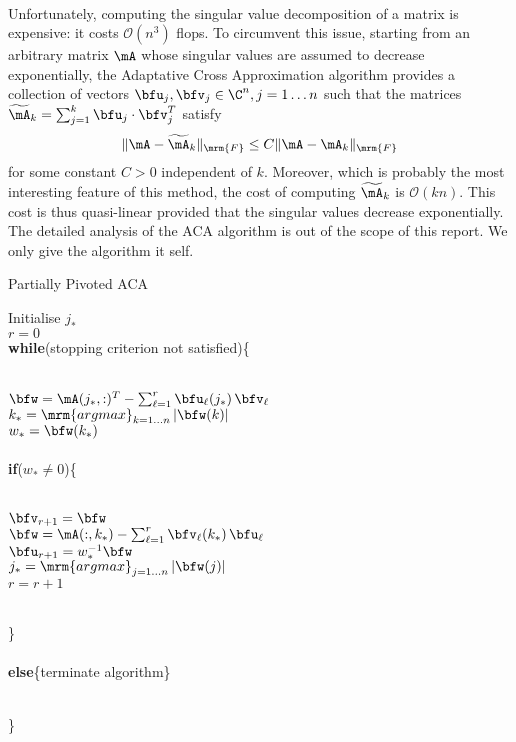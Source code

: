 \quad\\
Unfortunately, computing the singular value 
decomposition  of a matrix is expensive: it costs $\mathcal{O}(n^{3})$ flops. To circumvent this issue, starting from 
an arbitrary matrix $\mA$ whose singular values are assumed to decrease exponentially, the Adaptative 
Cross Approximation algorithm provides a collection of vectors $\bfu_{j},\bfv_{j}\in \C^{n}, j=1\dots n$ such that 
the matrices $\widetilde{\mA}_{k} = \sum_{j=1}^{k}\bfu_{j}\cdot\bfv_{j}^{T}$ satisfy 
$$
\Vert \mA - \widetilde{\mA}_{k}\Vert_{\mrm{F}}\leq C \Vert \mA - \mA_{k}\Vert_{\mrm{F}}
$$
for some constant $C>0$ independent of $k$. Moreover, which is probably the most interesting feature of this method, 
the cost of computing $\widetilde{\mA}_{k}$ is $\mathcal{O}(kn)$. This cost is thus quasi-linear provided that the singular 
values  decrease exponentially. The detailed analysis of the ACA algorithm is out of the scope of this report. We only 
give the algorithm it self.\\

\begin{algorithm}\label{AlgoACA}
  \caption{Partially Pivoted ACA}
  Initialise $j_{*}$\\
  $r=0$\\
  \textbf{while}(stopping criterion not satisfied)\{\\\quad\\
  \indent\hspace{0.5cm} \parbox{\linewidth}{
    $\bfw = \mA(j_{*},:)^{T} - \sum_{\ell=1}^{r}\bfu_{\ell}(j_{*})\,\bfv_{\ell}$\\
    $k_{*} = \mathop{\mrm{argmax}}_{k = 1\dots n}\vert \bfw(k)\vert$\\
    $w_{*} = \bfw(k_{*})$\\\quad\\
    \textbf{if}($w_{*}\neq 0$)\{\\\quad\\
    \indent\hspace{0.5cm} \parbox{\linewidth}{
      $\bfv_{r+1} = \bfw$\\
      $\bfw = \mA(:,k_{*})-\sum_{\ell = 1}^{r}\bfv_{\ell}(k_{*})\,\bfu_{\ell} $\\
      $\bfu_{r+1} = w_{*}^{-1}\bfw$\\      
      $j_{*} = \mathop{\mrm{argmax}}_{j = 1\dots n} \vert \bfw(j)\vert$\\
      $r=r+1$
    }
    \quad\\
    \}\\\quad\\
    \textbf{else}\{terminate algorithm\}
    }\\
  \}
\end{algorithm}


